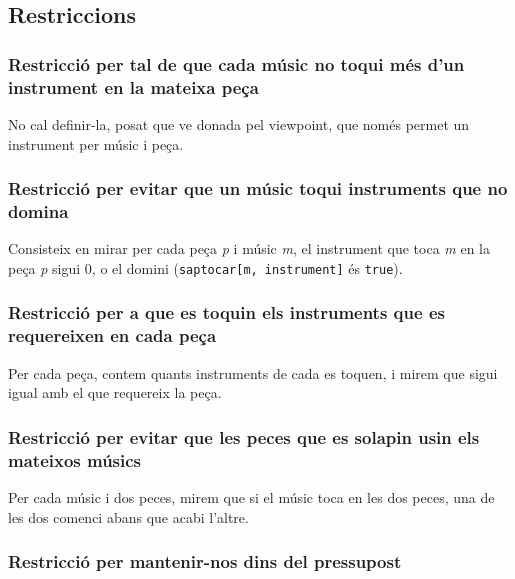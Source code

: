 \documentclass[11pt,a4paper,twoside]{report}
\begin{document}


\subsection{Restriccions}


\subsubsection*{Restricció per tal de que cada músic no toqui més d'un instrument en la mateixa peça}

No cal definir-la, posat que ve donada pel viewpoint, que només permet un instrument per músic i peça.

\subsubsection*{Restricció per evitar que un músic toqui instruments que no domina}

Consisteix en mirar per cada peça \textit{p} i músic \textit{m}, el instrument que toca \textit{m} en la peça \textit{p} sigui 0, o el domini (\texttt{saptocar[m, instrument]} és \texttt{true}).
~\\


\subsubsection*{Restricció per a que es toquin els instruments que es requereixen en cada peça}

Per cada peça, contem quants instruments de cada es toquen, i mirem que sigui igual amb el que requereix la peça.
~\\



\subsubsection*{Restricció per evitar que les peces que es solapin usin els mateixos músics}
Per cada músic i dos peces, mirem que si el músic toca en les dos peces, una de les dos comenci abans que acabi l'altre.
~\\



\subsubsection*{Restricció per mantenir-nos dins del pressupost}
\end{document}

